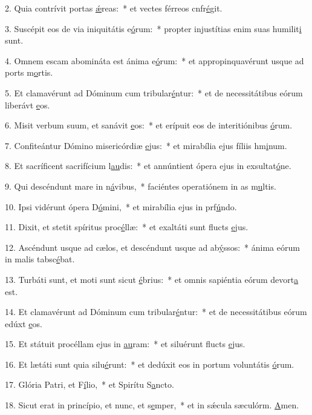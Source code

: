 2. Quia contrívit portas \uline{ǽ}reas:~* et vectes férreos cnfr\uline{é}git.\par 
3. Suscépit eos de via iniquitátis e\uline{ó}rum:~* propter injustítias enim suas humilit\uline{i} sunt.\par 
4. Omnem escam abomináta est ánima e\uline{ó}rum:~* et appropinquavérunt usque ad ports m\uline{o}rtis.\par 
5. Et clamavérunt ad Dóminum cum tribular\uline{é}ntur:~* et de necessitátibus eórum liberávt \uline{e}os.\par 
6. Misit verbum suum, et sanávit \uline{e}os:~* et erípuit eos de interitiónibus \uline{ó}rum.\par 
7. Confiteántur Dómino misericórdiæ \uline{e}jus:~* et mirabília ejus fíliis hm\uline{i}num.\par 
8. Et sacríficent sacrifícium l\uline{au}dis:~* et annúntient ópera ejus in exsultat\uline{ó}ne.\par 
9. Qui descéndunt mare in n\uline{á}vibus,~* faciéntes operatiónem in as m\uline{u}ltis.\par 
10. Ipsi vidérunt ópera D\uline{ó}mini,~* et mirabília ejus in prf\uline{ú}ndo.\par 
11. Dixit, et stetit spíritus proc\uline{é}llæ:~* et exaltáti sunt flucts \uline{e}jus.\par 
12. Ascéndunt usque ad cælos, et descéndunt usque ad ab\uline{ý}ssos:~* ánima eórum in malis tabsc\uline{é}bat.\par 
13. Turbáti sunt, et moti sunt sicut \uline{é}brius:~* et omnis sapiéntia eórum devort\uline{a} est.\par 
14. Et clamavérunt ad Dóminum cum tribular\uline{é}ntur:~* et de necessitátibus eórum edúxt \uline{e}os.\par 
15. Et státuit procéllam ejus in \uline{au}ram:~* et siluérunt flucts \uline{e}jus.\par 
16. Et lætáti sunt quia silu\uline{é}runt:~* et dedúxit eos in portum voluntátis \uline{ó}rum.\par 
17. Glória Patri, et F\uline{í}lio,~* et Spirítu S\uline{a}ncto.\par 
18. Sicut erat in princípio, et nunc, et s\uline{e}mper,~* et in sǽcula sæculórm. \uline{A}men.\par 
